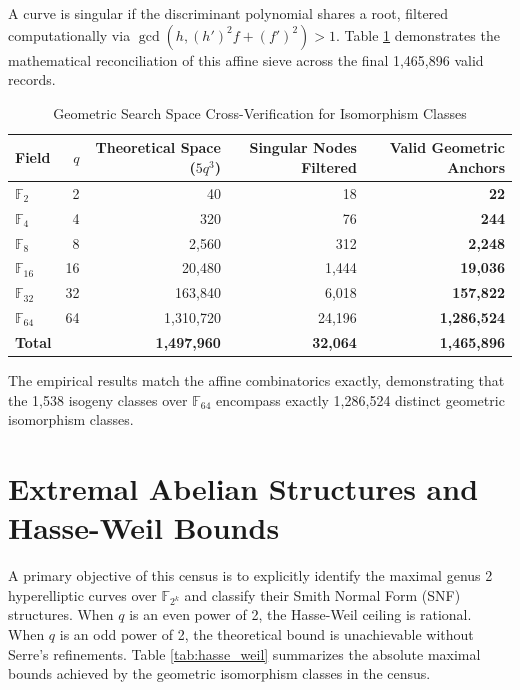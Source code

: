 \documentclass[11pt,letterpaper]{article}
\begin{document}
A curve is singular if the discriminant polynomial shares a root, filtered computationally via $\gcd(h, (h')^2f + (f')^2) > 1$. Table \ref{tab:geometric_space} demonstrates the mathematical reconciliation of this affine sieve across the final 1,465,896 valid records.

\begin{table}[h]
\centering
\caption{Geometric Search Space Cross-Verification for Isomorphism Classes}
\label{tab:geometric_space}
\begin{tabular}{lrrrr}
\toprule
Field & $q$ & Theoretical Space ($5q^3$) & Singular Nodes Filtered & Valid Geometric Anchors \\
\midrule
$\mathbb{F}_2$ & 2 & 40 & 18 & \textbf{22} \\
$\mathbb{F}_4$ & 4 & 320 & 76 & \textbf{244} \\
$\mathbb{F}_8$ & 8 & 2,560 & 312 & \textbf{2,248} \\
$\mathbb{F}_{16}$ & 16 & 20,480 & 1,444 & \textbf{19,036} \\
$\mathbb{F}_{32}$ & 32 & 163,840 & 6,018 & \textbf{157,822} \\
$\mathbb{F}_{64}$ & 64 & 1,310,720 & 24,196 & \textbf{1,286,524} \\
\midrule
\textbf{Total} & & \textbf{1,497,960} & \textbf{32,064} & \textbf{1,465,896} \\
\bottomrule
\end{tabular}
\end{table}

The empirical results match the affine combinatorics exactly, demonstrating that the 1,538 isogeny classes over $\mathbb{F}_{64}$ encompass exactly 1,286,524 distinct geometric isomorphism classes. 

\section{Extremal Abelian Structures and Hasse-Weil Bounds}
A primary objective of this census is to explicitly identify the maximal genus 2 hyperelliptic curves over $\mathbb{F}_{2^k}$ and classify their Smith Normal Form (SNF) structures. When $q$ is an even power of 2, the Hasse-Weil ceiling is rational. When $q$ is an odd power of 2, the theoretical bound is unachievable without Serre's refinements. Table \ref{tab:hasse_weil} summarizes the absolute maximal bounds achieved by the geometric isomorphism classes in the census.
\end{document}
